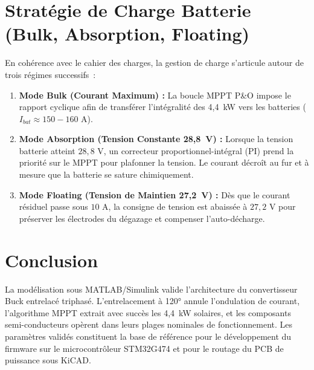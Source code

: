 \documentclass[11pt, a4paper]{article}
\begin{document}
\section{Stratégie de Charge Batterie (Bulk, Absorption, Floating)}
En cohérence avec le cahier des charges, la gestion de charge s'articule autour de trois régimes successifs~:
\begin{enumerate}
    \item \textbf{Mode Bulk (Courant Maximum) :} La boucle MPPT P\&O impose le rapport cyclique afin de transférer l'intégralité des 4,4~kW vers les batteries ($I_{bat} \approx 150 - 160\text{ A}$).
    \item \textbf{Mode Absorption (Tension Constante 28,8~V) :} Lorsque la tension batterie atteint $28{,}8\text{ V}$, un correcteur proportionnel-intégral (PI) prend la priorité sur le MPPT pour plafonner la tension. Le courant décroît au fur et à mesure que la batterie se sature chimiquement.
    \item \textbf{Mode Floating (Tension de Maintien 27,2~V) :} Dès que le courant résiduel passe sous $10\text{ A}$, la consigne de tension est abaissée à $27{,}2\text{ V}$ pour préserver les électrodes du dégazage et compenser l'auto-décharge.
\end{enumerate}

\section{Conclusion}
La modélisation sous MATLAB/Simulink valide l'architecture du convertisseur Buck entrelacé triphasé. L'entrelacement à 120° annule l'ondulation de courant, l'algorithme MPPT extrait avec succès les 4,4~kW solaires, et les composants semi-conducteurs opèrent dans leurs plages nominales de fonctionnement. Les paramètres validés constituent la base de référence pour le développement du firmware sur le microcontrôleur STM32G474 et pour le routage du PCB de puissance sous KiCAD.
\end{document}
